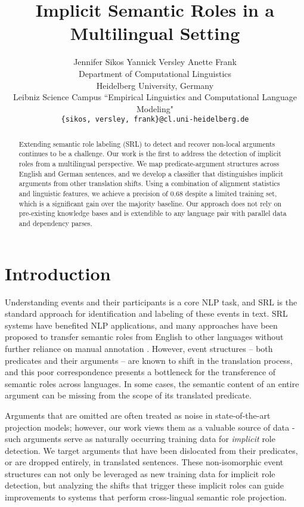 \documentclass[11pt]{article}
\title{Implicit Semantic Roles in a Multilingual Setting }
\author{Jennifer Sikos \qquad Yannick Versley \qquad Anette Frank\\
  Department of Computational Linguistics \\
  Heidelberg University, Germany\\
  Leibniz Science Campus ``Empirical Linguistics and Computational Language Modeling"\\
  {\tt \{sikos, versley, frank\}@cl.uni-heidelberg.de} \\}
\date{}
\begin{document}
\maketitle
\begin{abstract}
Extending semantic role labeling (SRL) to detect and recover non-local arguments continues to be a challenge. Our work is the first to address the detection of implicit roles from a multilingual perspective. We map predicate-argument structures across English and German sentences, and we develop a classifier that distinguishes implicit arguments from other translation shifts. Using a combination of alignment statistics and linguistic features, we achieve a precision of 0.68 despite a limited training set, which is a significant gain over the majority baseline. Our approach does not rely on pre-existing knowledge bases and is extendible to any language pair with parallel data and dependency parses.
\end{abstract}

\section{Introduction}
Understanding events and their participants is a core NLP task, and SRL is the standard approach for identification and labeling of these events in text. SRL systems \cite{tackstrom2015efficient,roth2014composition} have benefited NLP applications, and many approaches have been proposed to transfer semantic roles from English to other languages without further reliance on manual annotation \cite{kozhevnikov2013cross,pado2009cross}. However, event structures -- both predicates and their arguments -- are known to shift in the translation process, and this poor correspondence presents a bottleneck for the transference of semantic roles across languages. In some cases, the semantic content of an entire argument can be missing from the scope of its translated predicate. 

Arguments that are omitted are often treated as noise in state-of-the-art projection models; however, our work views them as a valuable source of data - such arguments serve as naturally occurring training data for \textit{implicit}
role detection.  We target arguments that have been dislocated from their predicates, or are dropped entirely, in translated sentences. These non-isomorphic event structures can not only be leveraged as new training data for implicit role detection, but analyzing the shifts that trigger these implicit roles can guide improvements to systems that perform cross-lingual semantic role projection. %
\end{document}
